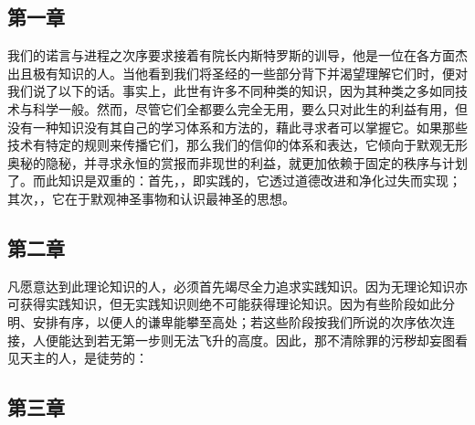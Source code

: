 
\subsection{第一章}

\par

我们的诺言与进程之次序要求接着有院长内斯特罗斯的训导，他是一位在各方面杰出且极有知识的人。当他看到我们将圣经的一些部分背下并渴望理解它们时，便对我们说了以下的话。事实上，此世有许多不同种类的知识，因为其种类之多如同技术与科学一般。然而，尽管它们全都要么完全无用，要么只对此生的利益有用，但没有一种知识没有其自己的学习体系和方法的，藉此寻求者可以掌握它。如果那些技术有特定的规则来传播它们，那么我们的信仰的体系和表达，它倾向于默观无形奥秘的隐秘，并寻求永恒的赏报而非现世的利益，就更加依赖于固定的秩序与计划了。而此知识是双重的：首先，，即实践的，它透过道德改进和净化过失而实现；其次，，它在于默观神圣事物和认识最神圣的思想。\par


\subsection{第二章}

\par

凡愿意达到此理论知识的人，必须首先竭尽全力追求实践知识。因为无理论知识亦可获得实践知识，但无实践知识则绝不可能获得理论知识。因为有些阶段如此分明、安排有序，以便人的谦卑能攀至高处；若这些阶段按我们所说的次序依次连接，人便能达到若无第一步则无法飞升的高度。因此，那不清除罪的污秽却妄图看见天主的人，是徒劳的： \par


\subsection{第三章}

\par

